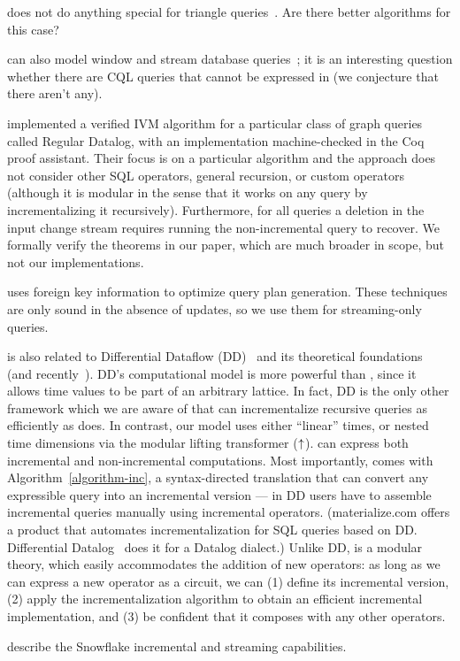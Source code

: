 \dbsp does not do anything special for triangle queries~\cite{kara-tds20}.  Are there
better algorithms for this case?

\dbsp can also model window and stream database
queries~\cite{arasu-tr02,aurora}; it is an interesting question
whether there are CQL queries that cannot be expressed in \dbsp (we
conjecture that there aren't any).

\cite{bonifati-iclp2018} implemented a verified IVM algorithm for a particular
class of graph queries called Regular Datalog, with an implementation machine-checked in the
Coq proof assistant. Their focus is on a particular algorithm and the approach does not
consider other SQL operators, general recursion, or custom operators (although it is modular
in the sense that it works on any query by incrementalizing it recursively). Furthermore,
for all queries a deletion in the input change stream requires running the non-incremental
query to recover.  We formally verify the theorems in our paper, which
are much broader in scope, but not our implementations.

\cite{svingos-amd23} uses foreign key information to optimize query
plan generation.  These techniques are only sound in the absence of
updates, so we use them for streaming-only queries.

\dbsp is also related to Differential Dataflow (DD)~\cite{mcsherry-cidr13,murray-sosp13}
and its theoretical foundations~\cite{abadi-fossacs15} (and recently~\cite{mcsherry-vldb20,chothia-vldb16}).
DD's computational model is more powerful than
\dbsp, since it allows time values to be part of an arbitrary lattice.
In fact, DD is the only other framework which we are aware of that can incrementalize
recursive queries as efficiently as \dbsp does.
In contrast, our model uses either ``linear'' times, or nested time dimensions via the modular lifting transformer (${\uparrow}$).
\dbsp can express both
incremental and non-incremental computations.  Most importantly, \dbsp comes with Algorithm~\ref{algorithm-inc}, a syntax-directed translation that can convert
any expressible query into an incremental version --- in DD users have
to assemble incremental queries manually using incremental operators.
(materialize.com offers a product that automates incrementalization
for SQL queries based on DD.  Differential Datalog~\cite{ryzhyk-datalog19}
does it for a Datalog dialect.)  Unlike DD, \dbsp is a modular theory,
which easily accommodates the addition of new operators:  as long as we can
express a new operator as a \dbsp circuit, we can (1) define its incremental version,
(2) apply the incrementalization algorithm to obtain an efficient
incremental implementation, and (3) be confident that it composes with any
other operators.

\cite{akidau-amd23,akidau-debs24} describe the Snowflake incremental
and streaming capabilities.

